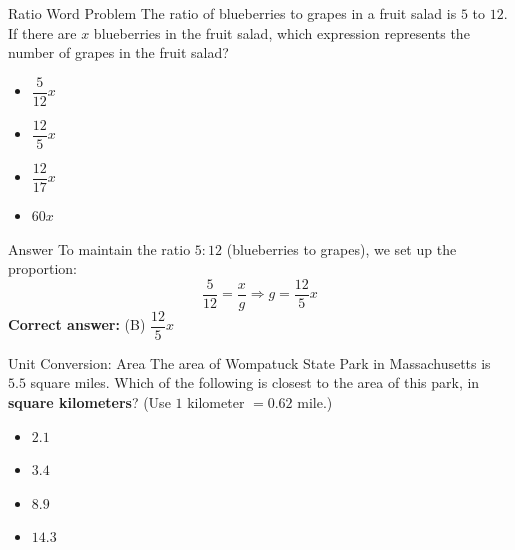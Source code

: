 \documentclass{beamer}
\begin{document}
\begin{frame}
\end{frame}



\begin{frame}{Ratio Word Problem}
The ratio of blueberries to grapes in a fruit salad is $5$ to $12$. If there are $x$ blueberries in the fruit salad, which expression represents the number of grapes in the fruit salad?
\begin{itemize}
    \item[(A)] $\dfrac{5}{12}x$
    \item[(B)] $\dfrac{12}{5}x$
    \item[(C)] $\dfrac{12}{17}x$
    \item[(D)] $60x$
\end{itemize}
\end{frame}


\begin{frame}{Answer}
To maintain the ratio $5:12$ (blueberries to grapes), we set up the proportion:
\[
\dfrac{5}{12} = \dfrac{x}{g} \Rightarrow g = \dfrac{12}{5}x
\]
\textbf{Correct answer:} (B) $\dfrac{12}{5}x$
\end{frame}

\begin{frame}{Unit Conversion: Area}
The area of Wompatuck State Park in Massachusetts is $5.5$ square miles. Which of the following is closest to the area of this park, in \textbf{square kilometers}? (Use $1$ kilometer $= 0.62$ mile.)
\begin{itemize}
    \item[(A)] $2.1$
    \item[(B)] $3.4$
    \item[(C)] $8.9$
    \item[(D)] $14.3$
\end{itemize}
\end{frame}
\end{document}
